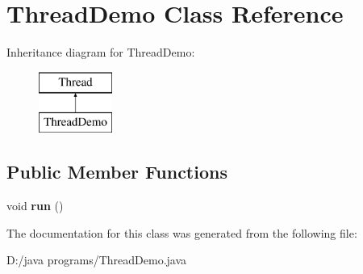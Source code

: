 \hypertarget{class_thread_demo}{}\section{Thread\+Demo Class Reference}
\label{class_thread_demo}
Inheritance diagram for Thread\+Demo\+:\begin{figure}[H]
\begin{center}
\leavevmode
\includegraphics[height=2.000000cm]{class_thread_demo}
\end{center}
\end{figure}
\subsection*{Public Member Functions}
\begin{DoxyCompactItemize}
\item 
\mbox{\label{class_thread_demo_a9a773d4113b4f51130a2969ff8419ba7}} 
void {\bfseries run} ()
\end{DoxyCompactItemize}


The documentation for this class was generated from the following file\+:\begin{DoxyCompactItemize}
\item 
D\+:/java programs/Thread\+Demo.\+java\end{DoxyCompactItemize}

